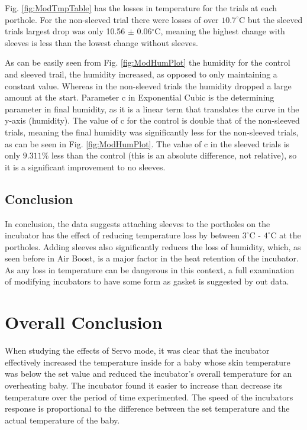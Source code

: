 \documentclass{article}
\begin{document}
\vspace{3mm}
Fig. \ref{fig:ModTmpTable} has the losses in temperature for the trials at each porthole. For the non-sleeved trial there were losses of over $10.7^{\circ}$C but the sleeved trials largest drop was only 10.56 $\pm$ 0.06$^{\circ}$C, meaning the highest change with sleeves is less than the lowest change without sleeves.  

\vspace{3mm}
As can be easily seen from Fig. \ref{fig:ModHumPlot} the humidity for the control and sleeved trail, the humidity increased, as opposed to only maintaining a constant value. Whereas in the non-sleeved trials the humidity dropped a large amount at the start. 
Parameter c in Exponential Cubic is the determining parameter in final humidity, as it is a linear term that translates the curve in the y-axis (humidity). The value of c for the control is double that of the non-sleeved trials, meaning the final humidity was significantly less for the non-sleeved trials, as can be seen in Fig. \ref{fig:ModHumPlot}. The value of c in the sleeved trials is only $9.311\%$ less than the control (this is an absolute difference, not relative), so it is a significant improvement to no sleeves.

\subsection{Conclusion}
In conclusion, the data suggests attaching sleeves to the portholes on the incubator has the effect of reducing temperature loss by between $3^{\circ}$C - $4^{\circ}$C at the portholes. Adding sleeves also significantly reduces the loss of humidity, which, as seen before in Air Boost, is a major factor in the heat retention of the incubator. As any loss in temperature can be dangerous in this context, a full examination of modifying incubators to have some form as gasket is suggested by out data.



\section{Overall Conclusion}
\vspace{3mm}

When studying the effects of Servo mode, it was clear that the incubator effectively increased the temperature inside for a baby whose skin temperature was below the set value and reduced the incubator's overall temperature for an overheating baby. The incubator found it easier to increase than decrease its temperature over the period of time experimented. The speed of the incubators response is proportional to the difference between the set temperature and the actual temperature of the baby. 
\end{document}
